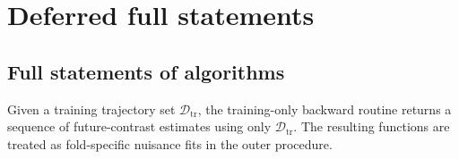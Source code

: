 \documentclass[opre,nonblindrev]{informs4}
\let\arxivSavedArgmin\argmin
\let\argmin\undefined
\let\argmin\arxivSavedArgmin
\providecommand{\cD}{\mathcal D}
\newcommand{\blipadv}{\tau}
\begin{document}


\section{Deferred full statements}\label{sec-apx-deferred-fullstatement}
\subsection{Full statements of algorithms}\label{app:recursive-unrolling}
Given a training trajectory set $\cD_{\mathrm{tr}}$, the training-only
backward routine returns a sequence of future-contrast estimates using only
$\cD_{\mathrm{tr}}$. The resulting
functions are treated as fold-specific nuisance fits in the outer procedure.
\end{document}
